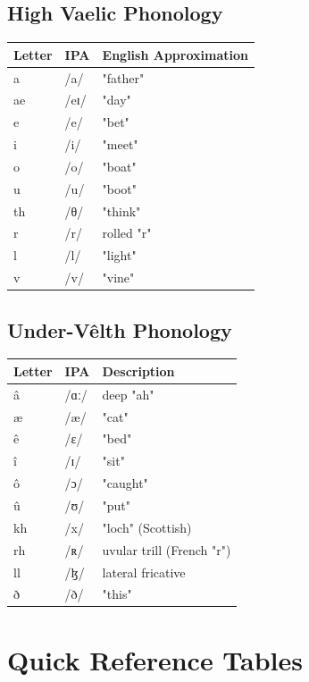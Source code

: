 \documentclass[11pt,a4paper,twoside]{book}
\begin{document}
\section{High Vaelic Phonology}

\begin{center}
\begin{tabular}{lll}
\textbf{Letter} & \textbf{IPA} & \textbf{English Approximation} \\
\hline
a & /a/ & "father" \\
ae & /eɪ/ & "day" \\
e & /e/ & "bet" \\
i & /i/ & "meet" \\
o & /o/ & "boat" \\
u & /u/ & "boot" \\
\hline
th & /θ/ & "think" \\
r & /r/ & rolled "r" \\
l & /l/ & "light" \\
v & /v/ & "vine" \\
\end{tabular}
\end{center}

\section{Under-Vêlth Phonology}

\begin{center}
\begin{tabular}{lll}
\textbf{Letter} & \textbf{IPA} & \textbf{Description} \\
\hline
â & /ɑː/ & deep "ah" \\
æ & /æ/ & "cat" \\
ê & /ɛ/ & "bed" \\
î & /ɪ/ & "sit" \\
ô & /ɔ/ & "caught" \\
û & /ʊ/ & "put" \\
\hline
kh & /x/ & "loch" (Scottish) \\
rh & /ʀ/ & uvular trill (French "r") \\
ll & /ɮ/ & lateral fricative \\
ð & /ð/ & "this" \\
\end{tabular}
\end{center}

\chapter{Quick Reference Tables}
\end{document}
